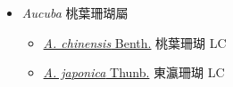 
  \begin{itemize}
 \item[] \textit{Aucuba} 桃葉珊瑚屬
                                
  \begin{itemize}
        \item[] \href{http://www.theplantlist.org/tpl1.1/search?q=Aucuba+chinensis}{\textit{A. chinensis} Benth.}   桃葉珊瑚   LC
        \item[] \href{http://www.theplantlist.org/tpl1.1/search?q=Aucuba+japonica}{\textit{A. japonica} Thunb.}   東瀛珊瑚   LC
  \end{itemize}
  \end{itemize}
